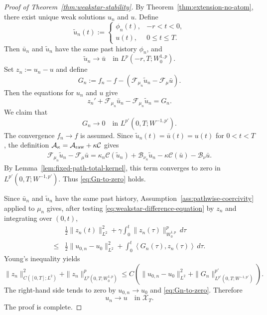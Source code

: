 \documentclass[a4paper,11pt,oneside,reqno]{amsart}
\newcounter{c}
\newcounter{d}
\newcounter{b}
\newcommand{\dual}[2]{\left\langle #1,#2\right\rangle}
\begin{document}
\begin{proof}[Proof of Theorem~\ref{thm:weakstar-stability}]
By Theorem~\ref{thm:extension-no-atom}, there exist unique weak solutions
\(u_n\) and \(u\). Define
\[
 \widetilde u_n(t):=
 \begin{cases}
  \phi_n(t), & -r<t<0,\\
  u(t), & 0\le t\le T.
 \end{cases}
\]
Then \(\bar u_n\) and \(\widetilde u_n\) have the same past history
\(\phi_n\), and
\[
 \widetilde u_n\to\bar u
 \quad\text{in }L^p(-r,T;W^{1,p}_0).
\]
Set \(z_n:=u_n-u\) and define
\[
 G_n:=f_n-f-
 \left(
  \mathcal F_{\mu_n}\widetilde u_n-
  \mathcal F_\mu\bar u
 \right).
\]
Then the equations for \(u_n\) and \(u\) give
\begin{equation}
 z_n'
 +\mathcal F_{\mu_n}\bar u_n
 -\mathcal F_{\mu_n}\widetilde u_n
 =G_n .
 \label{eq:weakstar-difference-equation}
\end{equation}
We claim that
\begin{equation}
 G_n\to0
 \quad\text{in }L^{p'}(0,T;W^{-1,p'}).
 \label{eq:Gn-to-zero}
\end{equation}
The convergence \(f_n\to f\) is assumed. Since \(\widetilde u_n(t)=\bar u(t)=u(t)\) for \(0<t<T\), the definition
\(\mathcal A_\kappa=\mathcal A_{\rm raw}+\kappa\mathcal C\) gives
\[
\begin{aligned}
 \mathcal F_{\mu_n}\widetilde u_n-
 \mathcal F_\mu\bar u
 =
 \kappa_n\mathcal C(\widetilde u_n)
 +\mathcal B_{\nu_n}\widetilde u_n 
 -
 \kappa\mathcal C(\bar u)
 -\mathcal B_\nu\bar u .
\end{aligned}
\]
By Lemma~\ref{lem:fixed-path-total-kernel}, this term converges to zero in
\(L^{p'}(0,T;W^{-1,p'})\). Thus \eqref{eq:Gn-to-zero} holds.

Since \(\bar u_n\) and \(\widetilde u_n\) have the same past history,
Assumption~\ref{ass:pathwise-coercivity} applied to \(\mu_n\) gives, after
testing \eqref{eq:weakstar-difference-equation} by \(z_n\) and integrating
over \((0,t)\),
\[
\begin{aligned}
 &\frac12\|z_n(t)\|_{L^2}^2
 +\gamma\int_0^t\|z_n(\tau)\|_{W^{1,p}_0}^p\,d\tau\\
 \le{}&
 \frac12\|u_{0,n}-u_0\|_{L^2}^2 
 +
 \int_0^t\dual{G_n(\tau)}{z_n(\tau)}\,d\tau .
\end{aligned}
\]
Young's inequality yields
\[
 \|z_n\|_{C([0,T];L^2)}^2
 +\|z_n\|_{L^p(0,T;W^{1,p}_0)}^p
 \le
 C\left(
  \|u_{0,n}-u_0\|_{L^2}^2
  +\|G_n\|_{L^{p'}(0,T;W^{-1,p'})}^{p'}
 \right).
\]
The right-hand side tends to zero by \(u_{0,n}\to u_0\) and
\eqref{eq:Gn-to-zero}. Therefore
\[
 u_n\to u
 \quad\text{in }\mathcal X_T.
\]
The proof is complete.
\end{proof}
\end{document}
